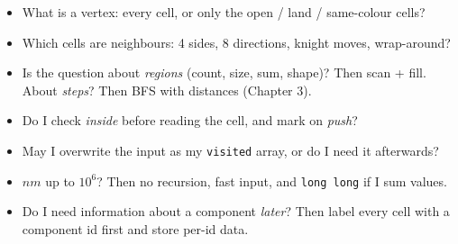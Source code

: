 \begin{checklistbox}
\begin{itemize}[leftmargin=*]
    \item[$\square$] What is a vertex: every cell, or only the open / land / same-colour cells?
    \item[$\square$] Which cells are neighbours: 4 sides, 8 directions, knight moves, wrap-around?
    \item[$\square$] Is the question about \emph{regions} (count, size, sum, shape)? Then scan + fill. About \emph{steps}? Then BFS with distances (Chapter 3).
    \item[$\square$] Do I check \emph{inside} before reading the cell, and mark on \emph{push}?
    \item[$\square$] May I overwrite the input as my \texttt{visited} array, or do I need it afterwards?
    \item[$\square$] $nm$ up to $10^6$? Then no recursion, fast input, and \texttt{long long} if I sum values.
    \item[$\square$] Do I need information about a component \emph{later}? Then label every cell with a component id first and store per-id data.
\end{itemize}
\end{checklistbox}

